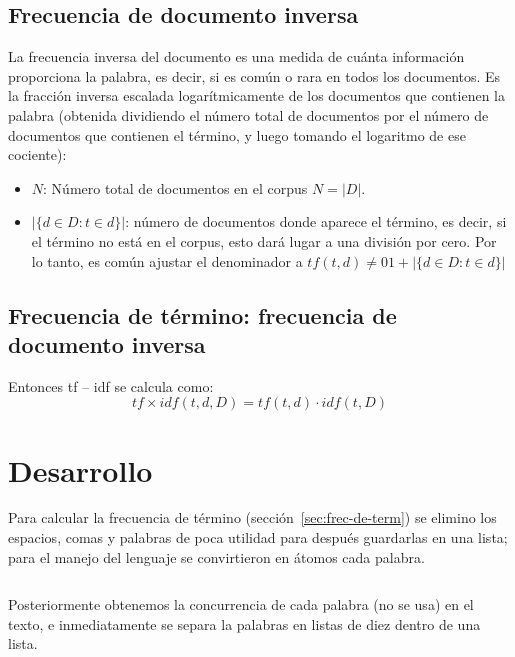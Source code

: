 \documentclass{IEEEtran}
\begin{document}
\subsection{Frecuencia de documento inversa}\label{sec:frec-de-docum}
La frecuencia inversa del documento es una medida de cuánta información
proporciona la palabra, es decir, si es común o rara en todos los documentos.
Es la fracción inversa escalada logarítmicamente de los documentos que
contienen la palabra (obtenida dividiendo el número total de documentos
por el número de documentos que contienen el término, y luego tomando el
logaritmo de ese cociente):
\begin{itemize}
  \item $N$: Número total de documentos en el corpus $N = |D| $.
  \item $|\{d \in D : t \in d\}|$: número de documentos donde aparece el término,
        es decir, si el término no está en el corpus, esto dará lugar a una división por cero. Por lo tanto, es     común ajustar el denominador a $tf(t,d) \ne 01 + |\{d \in D : t \in d \}|$

\end{itemize}

\subsection{Frecuencia de término: frecuencia de documento inversa}\label{sec:frec-de-term-1}
Entonces tf – idf se calcula como:
\[ tf \times idf(t,d,D) = tf(t,d) \cdot idf(t,D)\]

\section{Desarrollo}\label{sec:desarrollo}

Para calcular la frecuencia de término (sección~\ref{sec:frec-de-term}) se
elimino los espacios, comas y palabras de poca utilidad para después guardarlas
en una lista; para el manejo del lenguaje se convirtieron en átomos cada palabra.
\begin{code}
  \inputminted[firstline=5,lastline=26]{elixir}{../lib/corpus.ex}
\end{code}

Posteriormente obtenemos la concurrencia de cada palabra (no se usa) en el texto,
e inmediatamente se separa la palabras en listas de diez dentro de una lista.
\begin{code}
  \inputminted[firstline=29,lastline=43]{elixir}{../lib/corpus.ex}
\end{code}
\end{document}
